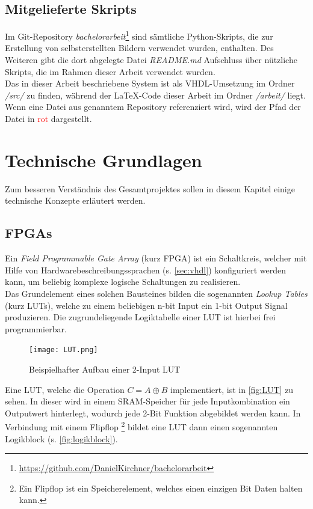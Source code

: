 \documentclass[a4paper,12pt,onesided]{report}
\begin{document}
\section{Mitgelieferte Skripts}
Im Git-Repository \textit{bachelorarbeit}\footnote{\url{https://github.com/DanielKirchner/bachelorarbeit}} sind sämtliche Python-Skripts, die zur Erstellung von selbsterstellten Bildern verwendet wurden, enthalten. Des Weiteren gibt die dort abgelegte Datei \textit{README.md} Aufschluss über nützliche Skripts, die im Rahmen dieser Arbeit verwendet wurden.\\
Das in dieser Arbeit beschriebene System ist als VHDL-Umsetzung im Ordner \textit{/src/} zu finden, während der \LaTeX-Code dieser Arbeit im Ordner \textit{/arbeit/} liegt.
Wenn eine Datei aus genanntem Repository referenziert wird, wird der Pfad der Datei in \textcolor{red}{rot} dargestellt.

\chapter{Technische Grundlagen}
Zum besseren Verständnis des Gesamtprojektes sollen in diesem Kapitel einige technische Konzepte erläutert werden.

\section{FPGAs}
\label{sec:fpga}
Ein \textit{Field Programmable Gate Array} (kurz FPGA) ist ein Schaltkreis, welcher mit Hilfe von Hardwarebeschreibungssprachen (s. \autoref{sec:vhdl})
konfiguriert werden kann, um beliebig komplexe logische Schaltungen zu realisieren.\\
Das Grundelement eines solchen Bausteines bilden die sogenannten \textit{Lookup Tables} (kurz LUTs), welche zu einem beliebigen n-bit Input ein 1-bit Output Signal produzieren. Die zugrundeliegende Logiktabelle einer LUT ist hierbei frei programmierbar.

\begin{figure}[H]
	\centering
	\texttt{[image: LUT.png]}
	\caption{Beispielhafter Aufbau einer 2-Input LUT}
	\label{fig:LUT}
\end{figure}

Eine LUT, welche die Operation $C = A \oplus B$ implementiert, ist in \autoref{fig:LUT} zu sehen. In dieser wird in einem SRAM-Speicher für jede Inputkombination ein Outputwert hinterlegt, wodurch jede 2-Bit Funktion abgebildet werden kann. In Verbindung mit einem Flipflop \footnote{Ein Flipflop ist ein Speicherelement, welches einen einzigen Bit Daten halten kann.} bildet eine LUT dann einen sogenannten Logikblock (s. \autoref{fig:logikblock}).\cite{fpgaDesign}
\end{document}
